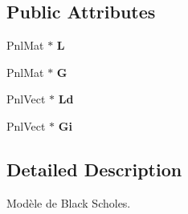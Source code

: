 \subsection*{Public Attributes}
\begin{DoxyCompactItemize}
\item 
\hypertarget{classBlackScholesModel_a594d10f44ce48630081dc135484858f3}{Pnl\-Mat $\ast$ {\bfseries L}}\label{classBlackScholesModel_a594d10f44ce48630081dc135484858f3}

\item 
\hypertarget{classBlackScholesModel_a36d3df049b17bb156dd2fbb7be71ffdc}{Pnl\-Mat $\ast$ {\bfseries G}}\label{classBlackScholesModel_a36d3df049b17bb156dd2fbb7be71ffdc}

\item 
\hypertarget{classBlackScholesModel_a5fb7c670af8a4b6a2e005f1937df7b33}{Pnl\-Vect $\ast$ {\bfseries Ld}}\label{classBlackScholesModel_a5fb7c670af8a4b6a2e005f1937df7b33}

\item 
\hypertarget{classBlackScholesModel_a918d901988d0d653b7bca0bd2b84f5c5}{Pnl\-Vect $\ast$ {\bfseries Gi}}\label{classBlackScholesModel_a918d901988d0d653b7bca0bd2b84f5c5}

\end{DoxyCompactItemize}


\subsection{Detailed Description}
Modèle de Black Scholes. 

